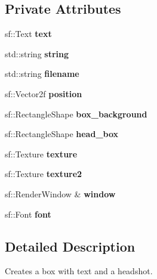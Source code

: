 \subsection*{Private Attributes}
\begin{DoxyCompactItemize}
\item 
\mbox{\label{classtextbox_a223ec9ec2629fa5a471515e0439e8224}} 
sf\+::\+Text {\bfseries text}
\item 
\mbox{\label{classtextbox_ae45b818e1fc1a764bdcf963c08b74e5a}} 
std\+::string {\bfseries string}
\item 
\mbox{\label{classtextbox_aceb46a9aaa13eefc19d456a278eb0aa1}} 
std\+::string {\bfseries filename}
\item 
\mbox{\label{classtextbox_a100c3576d01d8aa99cf734abd1ee8490}} 
sf\+::\+Vector2f {\bfseries position}
\item 
\mbox{\label{classtextbox_aa5a08ab3fe20572c18d50d7f1b889302}} 
sf\+::\+Rectangle\+Shape {\bfseries box\+\_\+background}
\item 
\mbox{\label{classtextbox_a06589b1fa2a0cdbcd63da5cc5b2af7ff}} 
sf\+::\+Rectangle\+Shape {\bfseries head\+\_\+box}
\item 
\mbox{\label{classtextbox_a5082584f3307c453b9a353705e404b8c}} 
sf\+::\+Texture {\bfseries texture}
\item 
\mbox{\label{classtextbox_aeb54488fab2eaa005b3bc0ebc59988f0}} 
sf\+::\+Texture {\bfseries texture2}
\item 
\mbox{\label{classtextbox_aee68466790250f271a7632d58506aee9}} 
sf\+::\+Render\+Window \& {\bfseries window}
\item 
\mbox{\label{classtextbox_a706ddbd8e600421b7303f4c0ab89c77d}} 
sf\+::\+Font {\bfseries font}
\end{DoxyCompactItemize}


\subsection{Detailed Description}
Creates a box with text and a headshot. 

